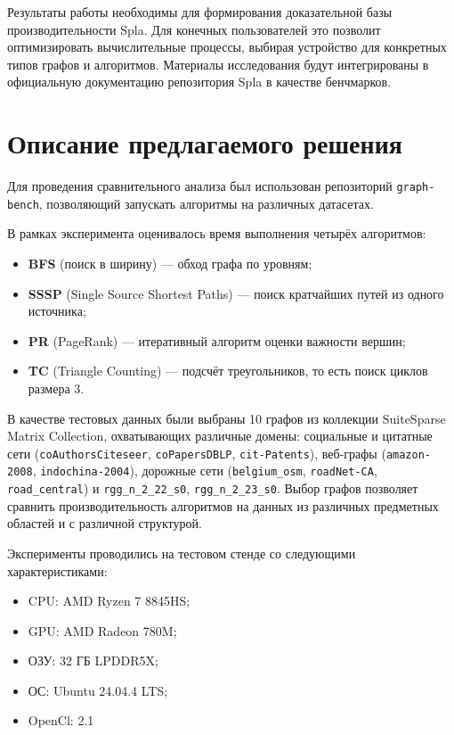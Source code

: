 \documentclass[a4paper]{article}
\begin{document}
	Результаты работы необходимы для формирования доказательной базы производительности Spla. Для конечных пользователей это позволит оптимизировать вычислительные процессы, выбирая устройство для конкретных типов графов и алгоритмов. Материалы исследования будут интегрированы в официальную документацию репозитория Spla в качестве бенчмарков.
	
	\section{Описание предлагаемого решения}
	
	Для проведения сравнительного анализа был использован репозиторий \texttt{graph-bench}, позволяющий запускать алгоритмы на различных датасетах.
	
	В рамках эксперимента оценивалось время выполнения четырёх алгоритмов:
	\begin{itemize}[noitemsep]
		\item \textbf{BFS} (поиск в ширину) --- обход графа по уровням;
		\item \textbf{SSSP} (Single Source Shortest Paths) --- поиск кратчайших путей из одного источника;
		\item \textbf{PR} (PageRank) --- итеративный алгоритм оценки важности вершин;
		\item \textbf{TC} (Triangle Counting) --- подсчёт треугольников, то есть поиск циклов размера 3.
	\end{itemize}
	
	В качестве тестовых данных были выбраны 10 графов из коллекции SuiteSparse Matrix Collection, охватывающих различные домены: социальные и цитатные сети (\texttt{coAuthorsCiteseer}, \texttt{coPapersDBLP}, \texttt{cit-Patents}), веб-графы (\texttt{amazon-2008}, \texttt{indochina-2004}), дорожные сети (\texttt{belgium\_osm}, \texttt{roadNet-CA}, \texttt{road\_central}) и \texttt{rgg\_n\_2\_22\_s0}, \texttt{rgg\_n\_2\_23\_s0}. Выбор графов позволяет сравнить производительность алгоритмов на данных из различных предметных областей и с различной структурой.
	
	Эксперименты проводились на тестовом стенде со следующими характеристиками:
	\begin{itemize}[noitemsep]
		\item CPU: AMD Ryzen 7 8845HS;
		\item GPU: AMD Radeon 780M;
		\item ОЗУ: 32 ГБ LPDDR5X;
		\item ОС: Ubuntu 24.04.4 LTS;
		\item OpenCl: 2.1
		\end{itemize}
	
\end{document}
